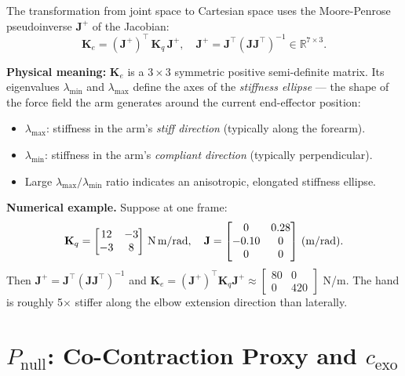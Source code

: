 \documentclass[11pt,a4paper]{article}
\begin{document}
The transformation from joint space to Cartesian space uses the
Moore-Penrose pseudoinverse $\mathbf{J}^+$ of the Jacobian:
\[
  \boxed{\mathbf{K}_e = (\mathbf{J}^+)^\top\,\mathbf{K}_q\,\mathbf{J}^+},
  \quad \mathbf{J}^+ = \mathbf{J}^\top(\mathbf{J}\mathbf{J}^\top)^{-1}
  \in \mathbb{R}^{7\times3}.
\]

\textbf{Physical meaning:} $\mathbf{K}_e$ is a $3\times3$ symmetric
positive semi-definite matrix. Its eigenvalues $\lambda_\text{min}$ and
$\lambda_\text{max}$ define the axes of the \emph{stiffness ellipse} ---
the shape of the force field the arm generates around the current
end-effector position:
\begin{itemize}
  \item $\lambda_\text{max}$: stiffness in the arm's \emph{stiff direction}
        (typically along the forearm).
  \item $\lambda_\text{min}$: stiffness in the arm's \emph{compliant
        direction} (typically perpendicular).
  \item Large $\lambda_\text{max}/\lambda_\text{min}$ ratio indicates
        an anisotropic, elongated stiffness ellipse.
\end{itemize}

\textbf{Numerical example.} Suppose at one frame:
\[
  \mathbf{K}_q = \begin{bmatrix}
    12 & -3 \\ -3 & 8
  \end{bmatrix}\,\text{N\,m/rad},\quad
  \mathbf{J} = \begin{bmatrix}
    0 & 0.28 \\ -0.10 & 0 \\ 0 & 0
  \end{bmatrix}\,\text{(m/rad)}.
\]
Then $\mathbf{J}^+ = \mathbf{J}^\top(\mathbf{J}\mathbf{J}^\top)^{-1}$ and
$\mathbf{K}_e = (\mathbf{J}^+)^\top\mathbf{K}_q\mathbf{J}^+ \approx
  \begin{bmatrix}80 & 0\\0&420\end{bmatrix}$ N/m. The hand is
roughly 5$\times$ stiffer along the elbow extension direction than
laterally.

\section{\texorpdfstring{$P_\text{null}$}{P\_null}: Co-Contraction Proxy and \texorpdfstring{$c_\text{exo}$}{c\_exo}}
\end{document}
